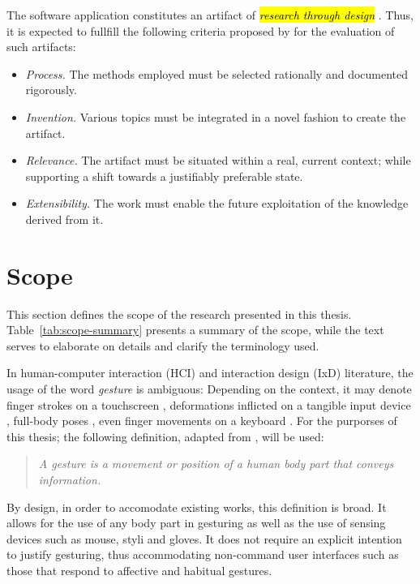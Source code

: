 The software application constitutes an artifact of \hl{\emph{research through design}} \parencite{Frayling:1993}. Thus, it is expected to fullfill the following criteria proposed by \textcite{Zimmerman:2007} for the evaluation of such artifacts:

\begin{itemize}
\item \emph{Process.} The methods employed must be selected rationally and documented rigorously.
\item \emph{Invention.} Various topics must be integrated in a novel fashion to create the artifact.
\item \emph{Relevance.} The artifact must be situated within a real, current context; while supporting a shift towards a justifiably preferable state.
\item \emph{Extensibility.} The work must enable the future exploitation of the knowledge derived from it.
\end{itemize}

\section{Scope}
\label{sec:scope}

This section defines the scope of the research presented in this thesis. Table~\ref{tab:scope-summary} presents a summary of the scope, while the text serves to elaborate on details and clarify the terminology used.

In human-computer interaction (HCI) and interaction design (IxD) literature, the usage of the word \emph{gesture} is ambiguous: Depending on the context, it may denote finger strokes on a touchscreen \parencite{Lu:2013}, deformations inflicted on a tangible input device \parencite{Warren:2013}, full-body poses \parencite{Walter:2013}, even finger movements on a keyboard \parencite{Zhang:2014}. For the purporses of this thesis; the following definition, adapted from \textcite{Kurtenbach:1990}, will be used:

\begin{quote}
\emph{A gesture is a movement or position of a human body part that conveys information.}
\end{quote}

By design, in order to accomodate existing works, this definition is broad. It allows for the use of any body part in gesturing as well as the use of sensing devices such as mouse, styli and gloves. It does not require an explicit intention to justify gesturing, thus accommodating non-command user interfaces \parencite{Nielsen:1993} such as those that respond to affective \parencite{Kapur:2005} and habitual \parencite{Liu:2009} gestures.

